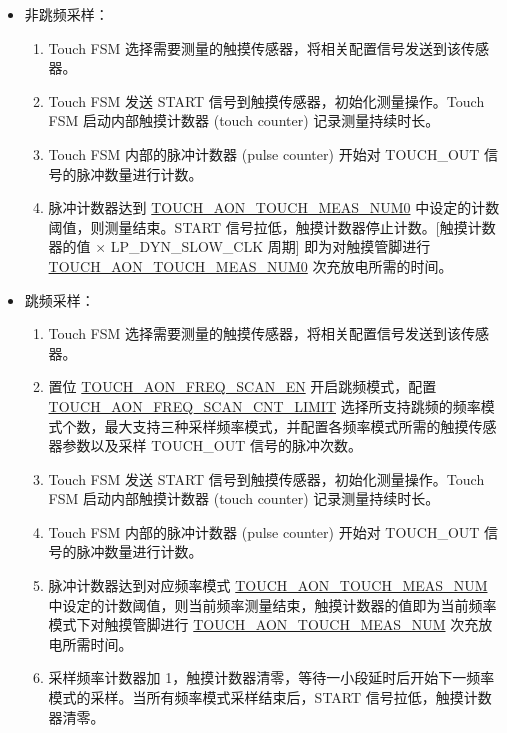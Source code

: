 \documentclass[main\_\_CN.tex]{subfiles}
\begin{document}
\begin{itemize}
    \item 非跳频采样：
        \begin{enumerate}
            \item Touch FSM 选择需要测量的触摸传感器，将相关配置信号发送到该传感器。
            \item Touch FSM 发送 START 信号到触摸传感器，初始化测量操作。Touch FSM 启动内部触摸计数器 (touch counter) 记录测量持续时长。
            \item Touch FSM 内部的脉冲计数器 (pulse counter) 开始对 TOUCH\_OUT 信号的脉冲数量进行计数。
            \item 脉冲计数器达到 \hyperref[fielddesc:TOUCHAONTOUCHMEASNUM0]{TOUCH\_AON\_TOUCH\_MEAS\_NUM0} 中设定的计数阈值，则测量结束。START 信号拉低，触摸计数器停止计数。[触摸计数器的值 × LP\_DYN\_SLOW\_CLK 周期] 即为对触摸管脚进行 \hyperref[fielddesc:TOUCHAONTOUCHMEASNUM0]{TOUCH\_AON\_TOUCH\_MEAS\_NUM0} 次充放电所需的时间。
        \end{enumerate}
    \item 跳频采样：
        \begin{enumerate}
            \item Touch FSM 选择需要测量的触摸传感器，将相关配置信号发送到该传感器。
            \item 置位 \hyperref[fielddesc:TOUCHAONFREQSCANEN]{TOUCH\_AON\_FREQ\_SCAN\_EN} 开启跳频模式，配置 \hyperref[fielddesc:TOUCHAONFREQSCANCNTLIMIT]{TOUCH\_AON\_FREQ\_SCAN\_CNT\_LIMIT} 选择所支持跳频的频率模式个数，最大支持三种采样频率模式，并配置各频率模式所需的触摸传感器参数以及采样 TOUCH\_OUT 信号的脉冲次数。
            \item Touch FSM 发送 START 信号到触摸传感器，初始化测量操作。Touch FSM 启动内部触摸计数器 (touch counter) 记录测量持续时长。
            \item Touch FSM 内部的脉冲计数器 (pulse counter) 开始对 TOUCH\_OUT 信号的脉冲数量进行计数。
            \item 脉冲计数器达到对应频率模式 \hyperref[fielddesc:TOUCHAONTOUCHMEASNUM0]{TOUCH\_AON\_TOUCH\_MEAS\_NUM} 中设定的计数阈值，则当前频率测量结束，触摸计数器的值即为当前频率模式下对触摸管脚进行 \hyperref[fielddesc:TOUCHAONTOUCHMEASNUM0]{TOUCH\_AON\_TOUCH\_MEAS\_NUM} 次充放电所需时间。
            \item 采样频率计数器加 1，触摸计数器清零，等待一小段延时后开始下一频率模式的采样。当所有频率模式采样结束后，START 信号拉低，触摸计数器清零。
        \end{enumerate}
\end{itemize}
\end{document}
